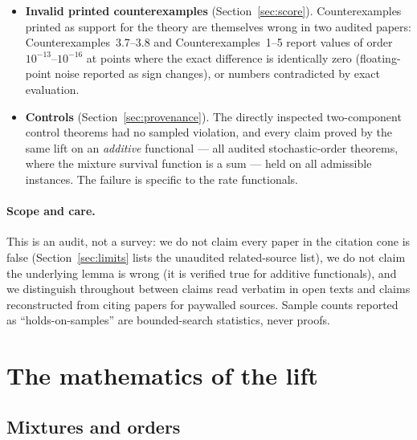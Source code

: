 \documentclass[10pt]{article}
\theoremstyle{plain}
\theoremstyle{definition}
\theoremstyle{remark}
\begin{document}
\begin{itemize}
\item[(e)] \textbf{Invalid printed counterexamples} (Section~\ref{sec:score}). Counterexamples printed as support for the theory are themselves wrong in two audited papers: \cite{SahooKayalFinkelstein2026} Counterexamples~3.7--3.8 and \cite{BhaktaKayalFinkelstein2024} Counterexamples~1--5 report values of order $10^{-13}$--$10^{-16}$ at points where the exact difference is identically zero (floating-point noise reported as sign changes), or numbers contradicted by exact evaluation.
\item[(f)] \textbf{Controls} (Section~\ref{sec:provenance}). The directly inspected two-component control theorems had no sampled violation, and every claim proved by the same lift on an \emph{additive} functional --- all audited stochastic-order theorems, where the mixture survival function is a sum --- held on all admissible instances. The failure is specific to the rate functionals.
\end{itemize}

\paragraph{Scope and care.} This is an audit, not a survey: we do not claim every paper in the citation cone is false (Section~\ref{sec:limits} lists the unaudited related-source list), we do not claim the underlying lemma is wrong (it is verified true for additive functionals), and we distinguish throughout between claims read verbatim in open texts and claims reconstructed from citing papers for paywalled sources. Sample counts reported as ``holds-on-samples'' are bounded-search statistics, never proofs.

\section{The mathematics of the lift}\label{sec:math}

\subsection{Mixtures and orders}
\end{document}
